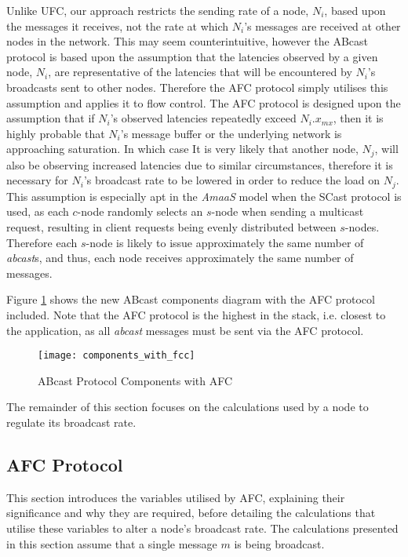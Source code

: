     Unlike \textsf{UFC}, our approach restricts the sending rate of a node, $N_i$, based upon the messages it receives, not the rate at which $N_i$'s messages are received at other nodes in the network.  This may seem counterintuitive, however the \textsf{ABcast} protocol is based upon the assumption that the latencies observed by a given node, $N_i$, are representative of the latencies that will be encountered by $N_i$'s broadcasts sent to other nodes.  Therefore the AFC protocol simply utilises this assumption and applies it to flow control.  The AFC protocol is designed upon the assumption that if $N_i$'s observed latencies repeatedly exceed $N_i.x_{mx}$, then it is highly probable that $N_i$'s message buffer or the underlying network is approaching saturation.  In which case It is very likely that another node, $N_j$, will also be observing increased latencies due to similar circumstances, therefore it is necessary for $N_i$'s broadcast rate to be lowered in order to reduce the load on $N_j$.  This assumption is especially apt in the \emph{AmaaS} model when the \textsf{SCast} protocol is used, as each $c$-node randomly selects an $s$-node when sending a multicast request, resulting in client requests being evenly distributed between $s$-nodes.  Therefore each $s$-node is likely to issue approximately the same number of \emph{abcast}s, and thus, each node receives approximately the same number of messages.          
    
    Figure \ref{fig:abcast_components_afc} shows the new \textsf{ABcast} components diagram with the AFC protocol included.  Note that the AFC protocol is the highest in the stack, i.e. closest to the application, as all \emph{abcast} messages must be sent via the AFC protocol.  
        
    \begin{figure}[!h] 
        \centering    
         \texttt{[image: components\_with\_fcc]}
         \caption[\textsf{ABcast} Protocol Components with AFC]{\textsf{ABcast} Protocol Components with AFC}
         \label{fig:abcast_components_afc}
    \end{figure}        
    
    The remainder of this section focuses on the calculations used by a node to regulate its broadcast rate.  
    
    \subsection*{AFC Protocol}     
     This section introduces the variables utilised by AFC, explaining their significance and why they are required, before detailing the calculations that utilise these variables to alter a node's broadcast rate.  The calculations presented in this section assume that a single message $m$ is being broadcast.  
         
